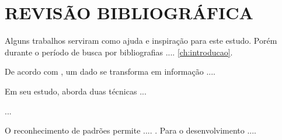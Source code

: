 
\chapter{REVISÃO BIBLIOGRÁFICA}\label{ch:rev-bibs}

Alguns trabalhos serviram como ajuda e inspiração para este estudo. Porém durante o período de busca por bibliografias .... \autoref{ch:introducao}.

De acordo com , um dado se transforma em informação ....

Em seu estudo,  aborda duas técnicas ...

...

O reconhecimento de padrões permite ....  \cite{logs-web}. Para o desenvolvimento ....













